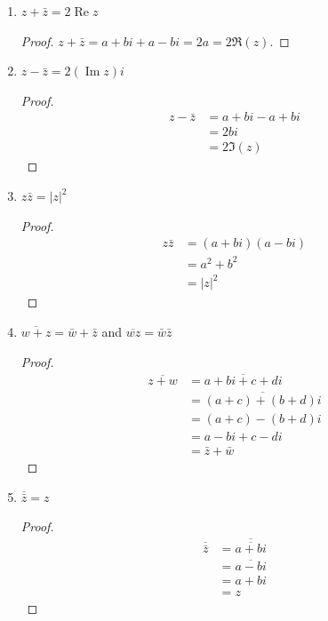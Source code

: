 \begin{enumerate}
\begin{enumerate}
        \item $z + \bar{z} = 2\operatorname{Re} z$
        \begin{proof}
             $z + \bar{z} = a + bi + a - bi = 2a = 2\Re(z)$. 
        \end{proof}
        \item $z - \bar{z} = 2(\operatorname{Im} z)i$
        \begin{proof}
            \begin{align*}
                z - \bar{z} &= a + bi - a + bi \\
                &= 2bi \\
                &= 2\Im(z)
            \end{align*}
        \end{proof}
        \item $z\bar{z} = |z|^2$
        \begin{proof}
            \begin{align*}
                z\bar{z} &= (a + bi)(a - bi) \\
                &= a^2 + b^2 \\
                &= |z|^2
            \end{align*}
        \end{proof}
        \item $\overline{w+z} = \bar{w} + \bar{z}$ and $\overline{wz} = \bar{w}\bar{z}$
        \begin{proof}
            \begin{align*}
                \overline{z + w} &= \overline{a + bi + c + di} \\
                &= \overline{(a + c) + (b + d)i} \\
                &= (a + c) - (b + d)i \\
                &= a - bi + c - di \\
                &= \bar z + \bar w 
            \end{align*}
        \end{proof}
        \item $\overline{\bar{z}} = z$
        \begin{proof}
            \begin{align*}
                \overline{\bar z} &= \overline{\overline{a + bi}} \\
                &= \overline{a - bi} \\
                &= a + bi \\
                &= z
            \end{align*}

\end{proof}
\end{enumerate}
\end{enumerate}
